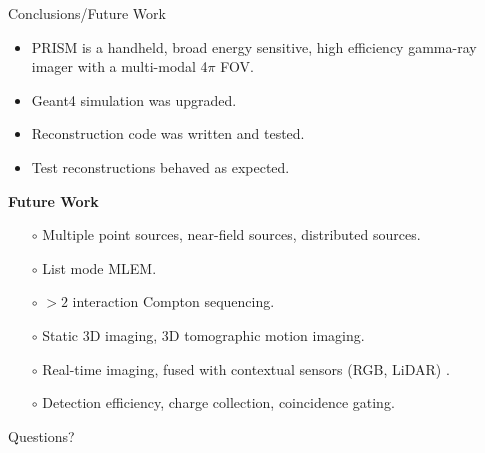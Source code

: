 \documentclass[xcolor=x11names,compress]{beamer}
\renewcommand{\(}{\begin{columns}}
\renewcommand{\)}{\end{columns}}
\newcommand{\<}[1]{\begin{column}{#1}}
\renewcommand{\>}{\end{column}}
\begin{document}
\begin{frame}{Conclusions/Future Work}

\begin{itemize}
\item PRISM is a handheld, broad energy sensitive, high efficiency gamma-ray imager with a multi-modal 4$\pi$ FOV.
\item Geant4 simulation was upgraded. %
\item Reconstruction code was written and tested. %
\item Test reconstructions behaved as expected.  %
\end{itemize}

\vspace{2ex}

\textbf{Future Work}
\begin{itemize}
\small
\item[$\circ$] Multiple point sources, near-field sources, distributed sources.
\item[$\circ$] List mode MLEM.
\item[$\circ$] $>2$ interaction Compton sequencing.
\item[$\circ$] Static 3D imaging, 3D tomographic motion imaging.
\item[$\circ$] Real-time imaging, fused with contextual sensors (RGB, LiDAR) \cite{Barnowski}.
\item[$\circ$] Detection efficiency, charge collection, coincidence gating.
\end{itemize}

\end{frame}



\begin{frame}[plain,c]

\begin{center}
\Large Questions?
\end{center}


\end{frame}
\end{document}
